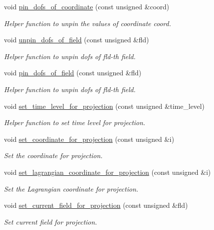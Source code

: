 \begin{DoxyCompactItemize}
void \hyperlink{classoomph_1_1ProjectionProblem_ade05dce90814098ec0af15324b758730}{pin\+\_\+dofs\+\_\+of\+\_\+coordinate} (const unsigned \&coord)
\begin{DoxyCompactList}\small\item\em Helper function to unpin the values of coordinate coord. \end{DoxyCompactList}\item 
void \hyperlink{classoomph_1_1ProjectionProblem_a36847f48bff4081b5db0c038ddba1260}{unpin\+\_\+dofs\+\_\+of\+\_\+field} (const unsigned \&fld)
\begin{DoxyCompactList}\small\item\em Helper function to unpin dofs of fld-\/th field. \end{DoxyCompactList}\item 
void \hyperlink{classoomph_1_1ProjectionProblem_acff96fd0e3dda445ba806e253988c547}{pin\+\_\+dofs\+\_\+of\+\_\+field} (const unsigned \&fld)
\begin{DoxyCompactList}\small\item\em Helper function to unpin dofs of fld-\/th field. \end{DoxyCompactList}\item 
void \hyperlink{classoomph_1_1ProjectionProblem_a935983de617d4fb2feeef674af13d473}{set\+\_\+time\+\_\+level\+\_\+for\+\_\+projection} (const unsigned \&time\+\_\+level)
\begin{DoxyCompactList}\small\item\em Helper function to set time level for projection. \end{DoxyCompactList}\item 
void \hyperlink{classoomph_1_1ProjectionProblem_ad8f93fb7e51a0e427b634d4dac8e96a3}{set\+\_\+coordinate\+\_\+for\+\_\+projection} (const unsigned \&i)
\begin{DoxyCompactList}\small\item\em Set the coordinate for projection. \end{DoxyCompactList}\item 
void \hyperlink{classoomph_1_1ProjectionProblem_a944bed6fe67a6e683d3c7eb242705b6e}{set\+\_\+lagrangian\+\_\+coordinate\+\_\+for\+\_\+projection} (const unsigned \&i)
\begin{DoxyCompactList}\small\item\em Set the Lagrangian coordinate for projection. \end{DoxyCompactList}\item 
void \hyperlink{classoomph_1_1ProjectionProblem_a616f08ea08e8f1ba6be018e966f38830}{set\+\_\+current\+\_\+field\+\_\+for\+\_\+projection} (const unsigned \&fld)
\begin{DoxyCompactList}\small\item\em Set current field for projection. \end{DoxyCompactList}\end{DoxyCompactItemize}
